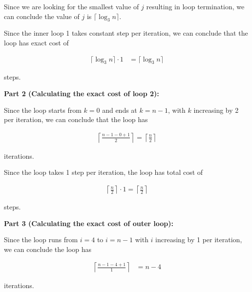 \documentclass[12pt]{article}
\begin{document}
\begin{enumerate}[a.]
    \bigskip

    Since we are looking for the smallest value of $j$ resulting in loop termination,
    we can conclude the value of $j$ is $\lceil \log_3 n \rceil$.

    \bigskip

    Since the inner loop 1 takes constant step per iteration, we can conclude that
    the loop has exact cost of

    \begin{align}
        \lceil \log_3 n \rceil \cdot 1 &= \lceil \log_3 n \rceil
    \end{align}

    steps.

    \bigskip

    \textbf{Part 2 (Calculating the exact cost of loop 2):}

    \bigskip

    Since the loop starts from $k = 0$ and ends at $k = n - 1$, with $k$ increasing
    by 2 per iteration, we can conclude that the loop has

    \begin{align}
        \left\lceil \frac{n - 1 -0 + 1}{2} \right\rceil = \left\lceil \frac{n}{2} \right\rceil
    \end{align}

    iterations.

    \bigskip

    Since the loop takes 1 step per iteration, the loop has total cost of

    \begin{align}
        \left\lceil \frac{n}{2} \right\rceil \cdot 1 = \left\lceil \frac{n}{2} \right\rceil
    \end{align}

    steps.

    \bigskip

    \textbf{Part 3 (Calculating the exact cost of outer loop):}

    \bigskip

    Since the loop runs from $i = 4$ to $i = n - 1$ with $i$ increasing by 1 per
    iteration, we can conclude the loop has

    \begin{align}
        \left\lceil \frac{n-1-4+1}{1} \right\rceil &= n - 4
    \end{align}

    iterations.

    \bigskip


\end{enumerate}
\end{document}
